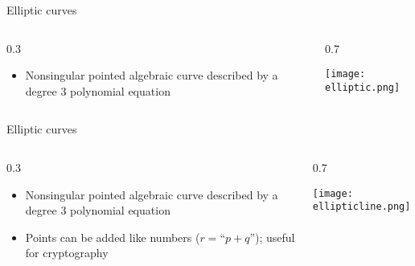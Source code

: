 \documentclass{beamer}
\theoremstyle{definition}
\begin{document}
                                                                                                           \begin{frame}{Elliptic curves}

                                                                                                                   \begin{columns}[c]
        \begin{column}{0.3\hsize}

          \begin{itemize}
            \item
          Nonsingular pointed algebraic curve described by a degree $3$
          polynomial equation
          \end{itemize}
        \end{column}
        \begin{column}{0.7\hsize}

            \texttt{[image: elliptic.png]}

        \end{column}
      \end{columns}
                                                                                                           \end{frame}

                                                                                                                                                                                                                      \begin{frame}{Elliptic curves}

                                                                                                                   \begin{columns}[c]
        \begin{column}{0.3\hsize}

          \begin{itemize}
            \item
          Nonsingular pointed algebraic curve described by a degree $3$
          polynomial equation
        \item Points can be added like numbers ($r=$``$p+q$''); useful for
          cryptography
          \end{itemize}
        \end{column}
        \begin{column}{0.7\hsize}

            \texttt{[image: ellipticline.png]}

        \end{column}
      \end{columns}
                                                                                                                                                                                                                      \end{frame}
\end{document}
